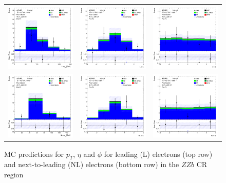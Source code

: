 \clearpage
\begin{figure}[htbp]
    \centering
  \begin{tabular}{ccc}

    \includegraphics[width=.2\textwidth]{figures/PreFitPlots/lep4_ZZb_4T_L_el_pt} &
    \includegraphics[width=.2\textwidth]{figures/PreFitPlots/lep4_ZZb_4T_L_el_eta} &
    \includegraphics[width=.2\textwidth]{figures/PreFitPlots/lep4_ZZb_4T_L_el_phi} \\
    \includegraphics[width=.2\textwidth]{figures/PreFitPlots/lep4_ZZb_4T_NL_el_pt} &
    \includegraphics[width=.2\textwidth]{figures/PreFitPlots/lep4_ZZb_4T_NL_el_eta} &
    \includegraphics[width=.2\textwidth]{figures/PreFitPlots/lep4_ZZb_4T_NL_el_phi} \\

  \end{tabular}
    \caption{MC predictions for $p_{T}$, $\eta$ and $\phi$ for leading (L) electrons (top row) and next-to-leading (NL) electrons (bottom row) in the $ZZb$ CR region }
  \label{fig:4lep-ZZb-CR-electronPlots}
\end{figure}



